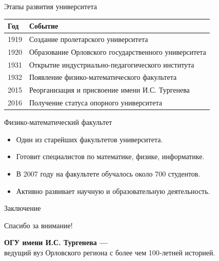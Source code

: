 \documentclass[10pt, russian]{beamer}
\begin{document}
\begin{frame}{Этапы развития университета}
    \begin{table}
        \centering
        \begin{tabular}{ll}
            \toprule
            \textbf{Год} & \textbf{Событие} \\
            \midrule
            1919 & Создание пролетарского университета \\
            1920 & Образование Орловского государственного университета \\
            1931 & Открытие индустриально-педагогического института \\
            1932 & Появление физико-математического факультета \\
            2015 & Реорганизация и присвоение имени И.С. Тургенева \\
            2016 & Получение статуса опорного университета \\
            \bottomrule
        \end{tabular}
    \end{table}
\end{frame}

\begin{frame}{Физико-математический факультет}
    \begin{itemize}
        \item Один из старейших факультетов университета.
        \item Готовит специалистов по математике, физике, информатике.
        \item В 2007 году на факультете обучалось около 700 студентов.
        \item Активно развивает научную и образовательную деятельность.
    \end{itemize}
\end{frame}

\begin{frame}{Заключение}
    \begin{center}
        \Large{Спасибо за внимание!}
        
        \vspace{1cm}
        \textbf{ОГУ имени И.С. Тургенева —} \\
        ведущий вуз Орловского региона с более чем 100-летней историей.
    \end{center}
\end{frame}
\end{document}
